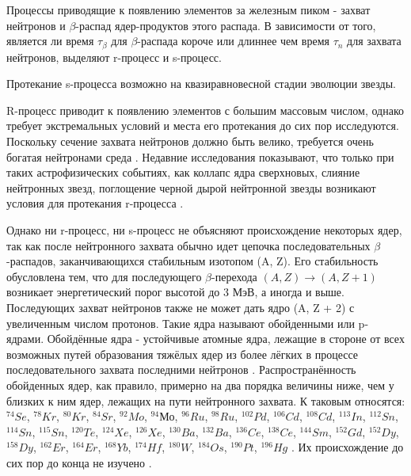 \documentclass[14pt, a4paper]{article}
\begin{document}
 Процессы приводящие к появлению элементов за железным пиком  - захват нейтронов \cite{cauldrons} и $\beta$-распад ядер-продуктов этого распада. В зависимости от того, является ли время $\tau_\beta$ для $\beta$-распада короче или длиннее чем время $\tau_n$ для захвата нейтронов, выделяют r-процесс и s-процесс.

 Протекание s-процесса возможно на квазиравновесной стадии эволюции звезды.

 R-процесс приводит к появлению элементов с большим массовым числом, однако требует экстремальных условий и места его протекания до сих пор исследуются. Поскольку сечение захвата нейтронов должно быть велико, требуется очень богатая нейтронами среда \cite{places}. Недавние исследования показывают, что только при таких астрофизических событиях, как коллапс ядра сверхновых, слияние нейтронных звезд,  поглощение черной дырой нейтронной звезды возникают условия для протекания r-процесса \cite{sites, neutrino, nsns, bhns1, collapsars}.


Однако ни r-процесс, ни s-процесс не объясняют происхождение некоторых ядер, так как после нейтронного захвата обычно идет цепочка последовательных $\beta$-распадов, заканчивающихся стабильным изотопом (A, Z). Его стабильность обусловлена тем, что для последующего $\beta$-перехода $(A, Z) \rightarrow (A, Z + 1)$ возникает энергетический порог высотой до 3 МэВ, а иногда и выше. Последующих захват нейтронов также не может дать ядро (A, Z + 2) с увеличенным числом протонов. Такие ядра называют обойденными или p-ядрами. Обойдённые ядра - устойчивые атомные ядра, лежащие в стороне от всех возможных путей образования тяжёлых ядер из более лёгких в процессе последовательного захвата последними нейтронов \cite{reactions}. Распространённость обойденных ядер, как правило, примерно на два порядка величины ниже, чем у близких к ним ядер, лежащих на пути нейтронного захвата. К таковым относятся: $^{74}Se$, $^{78}Kr$, $^{80}Kr$, $^{84}Sr$, $^{92}Mo$, $^{94}Мо$, $^{96}Ru$, $^{98}Ru$, $^{102}Pd$, $^{106}Cd$, $^{108}Cd$, $^{113}In$, $^{112}Sn$, $^{114}Sn$, $^{115}Sn$, $^{120}Te$, $^{124}Xe$, $^{126}Xe$, $^{130}Ba$, $^{132}Ba$, $^{136}Ce$, $^{138}Ce$, $^{144}Sm$, $^{152}Gd$, $^{152}Dy$, $^{158}Dy$, $^{162}Er$, $^{164}Er$, $^{168}Yb$, $^{174}Hf$, $^{180}W$, $^{184}Os$, $^{190}Pt$, $^{196}Hg$ \cite{role}. Их происхождение до сих пор до конца не изучено \cite{p-process}.
\end{document}
